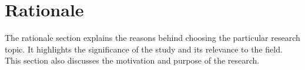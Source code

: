 \section{Rationale}
	The rationale section explains the reasons behind choosing the particular research topic. It highlights the significance of the study and its relevance to the field. This section also discusses the motivation and purpose of the research.